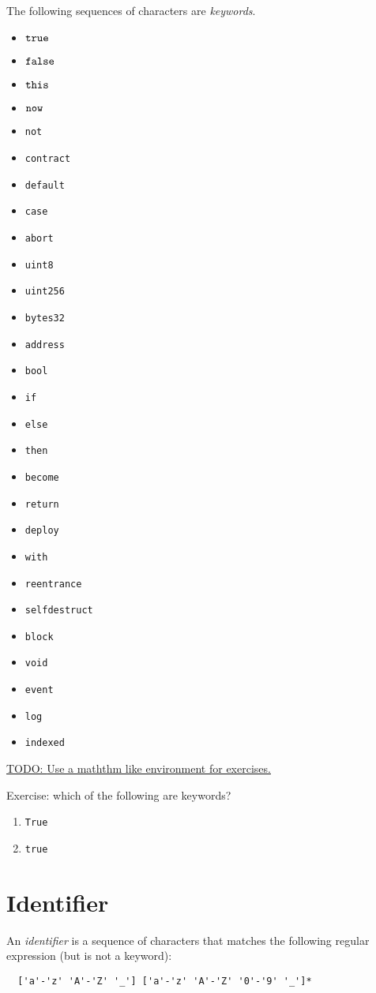 \documentclass{book}
\newcommand{\todo}[1]{\underline{TODO: {#1}}}
\begin{document}
The following sequences of characters are \textit{keywords}.
\begin{itemize}
\item $\text{\texttt{true}}$
\item $\text{\texttt{false}}$
\item $\text{\texttt{this}}$
\item $\text{\texttt{now}}$
\item \texttt{not}
\item \texttt{contract}
\item \texttt{default}
\item \texttt{case}
\item \texttt{abort}
\item \texttt{uint8}
\item \texttt{uint256}
\item \texttt{bytes32}
\item \texttt{address}
\item \texttt{bool}
\item \texttt{if}
\item \texttt{else}
\item \texttt{then}
\item \texttt{become}
\item \texttt{return}
\item \texttt{deploy}
\item \texttt{with}
\item \texttt{reentrance}
\item \texttt{selfdestruct}
\item \texttt{block}
\item \texttt{void}
\item \texttt{event}
\item \texttt{log}
\item \texttt{indexed}
\end{itemize}

\todo{Use a maththm like environment for exercises.}

Exercise: which of the following are keywords?
\begin{enumerate}
\item \texttt{True}
\item \texttt{true}
\end{enumerate}

\section{Identifier}

An \textit{identifier} is a sequence of characters that matches the following regular expression (but is not a keyword):
\begin{verbatim}
  ['a'-'z' 'A'-'Z' '_'] ['a'-'z' 'A'-'Z' '0'-'9' '_']*
\end{verbatim}
\end{document}
